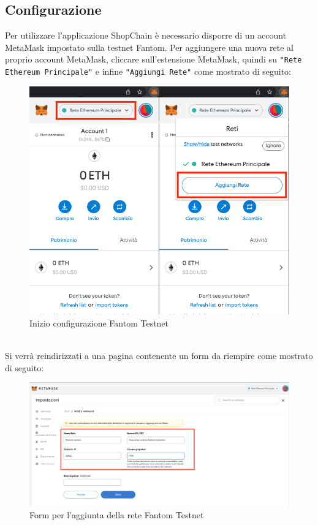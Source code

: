 \subsection{Configurazione}
Per utilizzare l'applicazione ShopChain è necessario disporre di un account MetaMask impostato sulla testnet Fantom.
Per aggiungere una nuova rete al proprio account MetaMask, cliccare sull'estensione MetaMask, quindi su \texttt{"Rete Ethereum Principale"}  e infine \texttt{"Aggiungi Rete"} come mostrato di seguito:
\begin{figure}[H]
    \centering
    \includegraphics[scale=0.4]{immagini/MetaMask/Configuration.png}
    \caption{Inizio configurazione Fantom Testnet}
\end{figure}
\textbf{}\\
Si verrà reindirizzati a una pagina contenente un form da riempire come mostrato di seguito:
\begin{figure}[H]
    \centering
    \includegraphics[scale=0.3]{immagini/MetaMask/ConfData.png}
    \caption{Form per l'aggiunta della rete Fantom Testnet}
\end{figure} 
